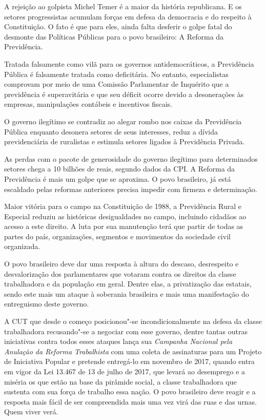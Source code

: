 A rejeição ao golpista Michel Temer é a maior da história republicana. E
os setores progressistas acumulam forças em defesa da democracia e do
respeito à Constituição. O fato é que para eles, ainda falta desferir o
golpe fatal do desmonte das Políticas Públicas para o povo brasileiro: A
Reforma da Previdência.

Tratada falsamente como vilã para os governos antidemocráticos, a
Previdência Pública é falsamente tratada como deficitária. No entanto,
especialistas comprovam por meio de uma Comissão Parlamentar de
Inquérito que a previdência é superavitária e que seu déficit ocorre
devido a desonerações às empresas, manipulações contábeis e incentivos
fiscais.

O governo ilegítimo se contradiz ao alegar rombo nos caixas da
Previdência Pública enquanto desonera setores de seus interesses, reduz
a dívida previdenciária de ruralistas e estimula setores ligados à
Previdência Privada.

As perdas com o pacote de generosidade do governo ilegítimo para
determinados setores chega a 10 bilhões de reais, segundo dados da CPI.
A Reforma da Previdência é mais um golpe que se aproxima. O povo
brasileiro, já está escaldado pelas reformas anteriores precisa impedir
com firmeza e determinação.

Maior vitória para o campo na Constituição de 1988, a Previdência Rural
e Especial reduziu as históricas desigualdades no campo, incluindo
cidadãos ao acesso a este direito. A luta por sua manutenção terá que
partir de todas as partes do país, organizações, segmentos e movimentos
da sociedade civil organizada.

O povo brasileiro deve dar uma resposta à altura do descaso, desrespeito
e desvalorização dos parlamentares que votaram contra os direitos da
classe trabalhadora e da população em geral. Dentre elas, a privatização
das estatais, sendo este mais um ataque à soberania brasileira e mais
uma manifestação do entreguismo deste governo.

A CUT que desde o começo posicionou"-se incondicionalmente na defesa da
classe trabalhadora recusando"-se a negociar com esse governo, dentre
tantas outras iniciativas contra todos esses ataques lança sua
\emph{Campanha Nacional pela Anulação da Reforma Trabalhista} com uma
coleta de assinaturas para um Projeto de Iniciativa Popular e pretende
entregá-lo em novembro de 2017, quando entra em vigor da Lei 13.467 de
13 de julho de 2017, que levará ao desemprego e a miséria os que estão
na base da pirâmide social, a classe trabalhadora que sustenta com sua
força de trabalho essa nação. O povo brasileiro deve reagir e a resposta
mais fácil de ser compreendida mais uma vez virá das ruas e das urnas.
Quem viver verá.

